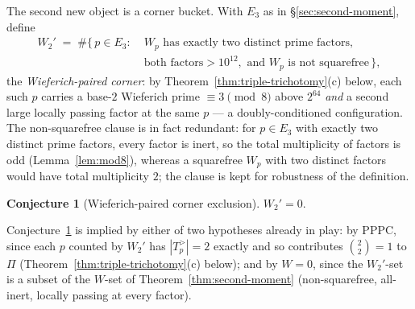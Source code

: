 \documentclass[11pt]{amsart}
\theoremstyle{plain}
\theoremstyle{definition}
\newtheorem{conjecture}[theorem]{Conjecture}
\theoremstyle{remark}
\numberwithin{equation}{section}
\begin{document}
The second new object is a corner bucket. With $E_3$ as in \S\ref{sec:second-moment}, define
\[
  \begin{aligned}
  W_2' \;=\; \#\{\,p \in E_3 :\; &W_p \text{ has exactly two distinct prime factors,}\\
  &\text{both factors} > 10^{12}, \text{ and } W_p \text{ is not squarefree}\,\},
  \end{aligned}
\]
the \emph{Wieferich-paired corner}: by Theorem~\ref{thm:triple-trichotomy}(c) below, each such $p$ carries a base-$2$ Wieferich prime $\equiv 3 \pmod 8$ above $2^{64}$ \emph{and} a second large locally passing factor at the same $p$ --- a doubly-conditioned configuration. The non-squarefree clause is in fact redundant: for $p \in E_3$ with exactly two distinct prime factors, every factor is inert, so the total multiplicity of factors is odd (Lemma~\ref{lem:mod8}), whereas a squarefree $W_p$ with two distinct factors would have total multiplicity $2$; the clause is kept for robustness of the definition.

\begin{conjecture}[Wieferich-paired corner exclusion]\label{conj:w2prime}
$W_2' = 0$.
\end{conjecture}

Conjecture~\ref{conj:w2prime} is implied by either of two hypotheses already in play: by PPPC, since each $p$ counted by $W_2'$ has $|T_p^{>}| = 2$ exactly and so contributes $\binom{2}{2} = 1$ to $\Pi$ (Theorem~\ref{thm:triple-trichotomy}(c) below); and by $W = 0$, since the $W_2'$-set is a subset of the $W$-set of Theorem~\ref{thm:second-moment} (non-squarefree, all-inert, locally passing at every factor).
\end{document}
